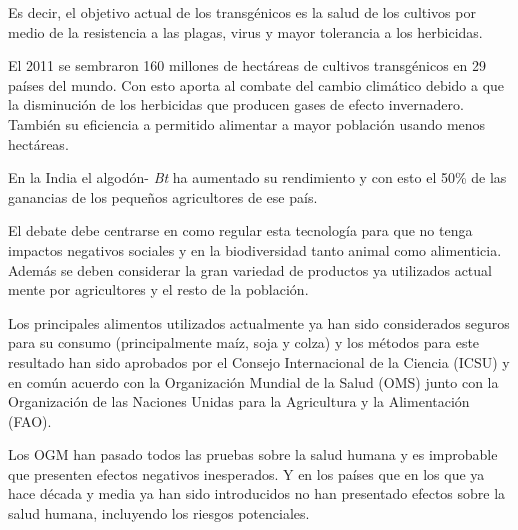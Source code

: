 \documentclass[11pt]{article}
\begin{document}
Es decir, el objetivo actual de los transgénicos es la salud de los cultivos por medio de la resistencia a las plagas, virus y mayor tolerancia a los herbicidas.

El 2011 se sembraron 160 millones de hectáreas de cultivos transgénicos en 29 países del mundo. Con esto aporta al combate del cambio climático debido a que la disminución de los herbicidas que producen gases de efecto invernadero. También su eficiencia a permitido alimentar a mayor población usando menos hectáreas.

En la India el algodón- \emph{Bt} ha aumentado su rendimiento y con esto el 50\% de las ganancias de los pequeños agricultores de ese país. 

El debate debe centrarse en como regular esta tecnología para que no tenga impactos negativos sociales y en la biodiversidad tanto animal como alimenticia. Además se deben considerar la gran variedad de productos ya utilizados actual mente por agricultores y el resto de la población.

Los principales alimentos utilizados actualmente ya han sido considerados seguros para su consumo (principalmente maíz, soja y colza) y los métodos para este resultado han sido aprobados por el Consejo Internacional de la Ciencia (ICSU) y en común acuerdo con la Organización Mundial de la Salud (OMS) junto con la Organización de las Naciones Unidas para la Agricultura y la Alimentación (FAO).

Los OGM han pasado todos las pruebas sobre la salud humana y es improbable que presenten efectos negativos inesperados. Y en los países que en los que ya hace década y media ya han sido introducidos no han presentado efectos sobre la salud humana, incluyendo los riesgos potenciales.







\end{document}
